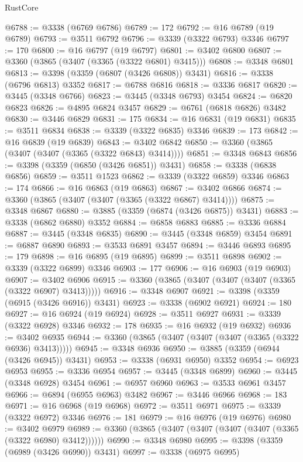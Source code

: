 \begin{lexlean}{RustCore}
\begin{coremodule}
@6788 := @3338 (@6769 @6786)
@6789 := 172
@6792 := @16 @6789 (@19 @6789)
@6793 := @3511 @6792
@6796 := @3339 (@3322 @6793) @3346
@6797 := 170
@6800 := @16 @6797 (@19 @6797)
@6801 := @3402 @6800
@6807 := @3360 (@3865 (@3407 (@3365 (@3322 @6801) @3415)))
@6808 := @3348 @6801
@6813 := @3398 (@3359 (@6807 (@3426 @6808)) @3431)
@6816 := @3338 (@6796 @6813) @3352
@6817 := @6788 @6816
@6818 := @3336 @6817
@6820 := @3445 (@3348 @6766)
@6823 := @3445 (@3348 @6793) @3454
@6824 := @6820 @6823
@6826 := @4895 @6824 @3457
@6829 := @6761 (@6818 @6826) @3482
@6830 := @3446 @6829
@6831 := 175
@6834 := @16 @6831 (@19 @6831)
@6835 := @3511 @6834
@6838 := @3339 (@3322 @6835) @3346
@6839 := 173
@6842 := @16 @6839 (@19 @6839)
@6843 := @3402 @6842
@6850 := @3360 (@3865 (@3407 (@3407 (@3365 (@3322 @6843) @3414))))
@6851 := @3348 @6843
@6856 := @3398 (@3359 (@6850 (@3426 @6851)) @3431)
@6858 := @3338 (@6838 @6856)
@6859 := @3511 @1523
@6862 := @3339 (@3322 @6859) @3346
@6863 := 174
@6866 := @16 @6863 (@19 @6863)
@6867 := @3402 @6866
@6874 := @3360 (@3865 (@3407 (@3407 (@3365 (@3322 @6867) @3414))))
@6875 := @3348 @6867
@6880 := @3885 (@3359 (@6874 (@3426 @6875)) @3431)
@6883 := @3338 (@6862 @6880) @3352
@6884 := @6858 @6883
@6885 := @3336 @6884
@6887 := @3445 (@3348 @6835)
@6890 := @3445 (@3348 @6859) @3454
@6891 := @6887 @6890
@6893 := @3533 @6891 @3457
@6894 := @3446 @6893
@6895 := 179
@6898 := @16 @6895 (@19 @6895)
@6899 := @3511 @6898
@6902 := @3339 (@3322 @6899) @3346
@6903 := 177
@6906 := @16 @6903 (@19 @6903)
@6907 := @3402 @6906
@6915 := @3360 (@3865 (@3407 (@3407 (@3407 (@3365 (@3322 @6907) @3413)))))
@6916 := @3348 @6907
@6921 := @3398 (@3359 (@6915 (@3426 @6916)) @3431)
@6923 := @3338 (@6902 @6921)
@6924 := 180
@6927 := @16 @6924 (@19 @6924)
@6928 := @3511 @6927
@6931 := @3339 (@3322 @6928) @3346
@6932 := 178
@6935 := @16 @6932 (@19 @6932)
@6936 := @3402 @6935
@6944 := @3360 (@3865 (@3407 (@3407 (@3407 (@3365 (@3322 @6936) @3413)))))
@6945 := @3348 @6936
@6950 := @3885 (@3359 (@6944 (@3426 @6945)) @3431)
@6953 := @3338 (@6931 @6950) @3352
@6954 := @6923 @6953
@6955 := @3336 @6954
@6957 := @3445 (@3348 @6899)
@6960 := @3445 (@3348 @6928) @3454
@6961 := @6957 @6960
@6963 := @3533 @6961 @3457
@6966 := @6894 (@6955 @6963) @3482
@6967 := @3446 @6966
@6968 := 183
@6971 := @16 @6968 (@19 @6968)
@6972 := @3511 @6971
@6975 := @3339 (@3322 @6972) @3346
@6976 := 181
@6979 := @16 @6976 (@19 @6976)
@6980 := @3402 @6979
@6989 := @3360 (@3865 (@3407 (@3407 (@3407 (@3407 (@3365 (@3322 @6980) @3412))))))
@6990 := @3348 @6980
@6995 := @3398 (@3359 (@6989 (@3426 @6990)) @3431)
@6997 := @3338 (@6975 @6995)

\end{coremodule}
\end{lexlean}
